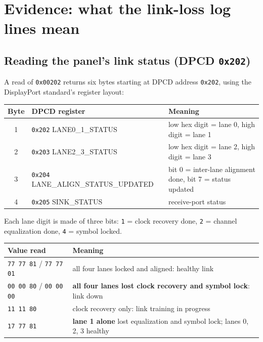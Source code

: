 \documentclass[11pt,a4paper]{article}
\newcommand{\reg}[1]{\texttt{#1}}
\begin{document}
\section{Evidence: what the link-loss log lines mean}
\subsection{Reading the panel's link status (DPCD \reg{0x202})}
A read of \reg{0x00202} returns six bytes starting at DPCD address \reg{0x202}, using the DisplayPort standard's register layout:

\begin{table}[H]
\centering
\small
\begin{tabularx}{\linewidth}{@{}c l Y@{}}
\toprule
Byte & DPCD register & Meaning\\
 & \reg{0x202} LANE0\_1\_STATUS & low hex digit = lane 0, high digit = lane 1\\
2 & \reg{0x203} LANE2\_3\_STATUS & low hex digit = lane 2, high digit = lane 3\\
3 & \reg{0x204} LANE\_ALIGN\_STATUS\_UPDATED & bit 0 = inter-lane alignment done, bit 7 = status updated\\
4 & \reg{0x205} SINK\_STATUS & receive-port status\\
\bottomrule
\end{tabularx}
\end{table}

\noindent Each lane digit is made of three bits: \reg{1} = clock recovery done, \reg{2} = channel equalization done, \reg{4} = symbol locked.

\begin{table}[H]
\centering
\begin{tabular}{@{}l l@{}}
\toprule
Value read & Meaning\\
\midrule
\reg{77 77 81} / \reg{77 77 01} & all four lanes locked and aligned: \textcolor{good}{healthy link}\\
\reg{00 00 80} / \reg{00 00 00} & \textcolor{bad}{\textbf{all four lanes lost clock recovery and symbol lock}}: link down\\
\reg{11 11 80} & clock recovery only: link training in progress\\
\reg{17 77 81} & \textcolor{bad}{\textbf{lane 1 alone}} lost equalization and symbol lock; lanes 0, 2, 3 healthy\\
\bottomrule
\end{tabular}
\end{table}
\end{document}

